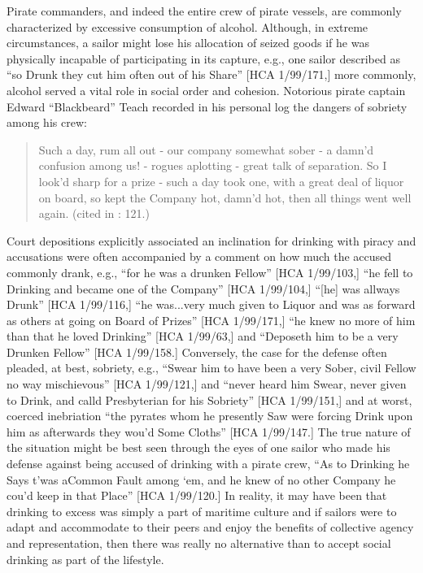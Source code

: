 Pirate commanders, and indeed the entire crew of pirate vessels, are commonly characterized by excessive consumption of alcohol. Although, in extreme circumstances, a sailor might lose his allocation of seized goods if he was physically incapable of participating in its capture, e.g., one sailor described as “so Drunk they cut him often out of his Share” [HCA 1/99/171,] more commonly, alcohol served a vital role in social order and cohesion. Notorious pirate captain Edward “Blackbeard” Teach recorded in his personal log the dangers of sobriety among his crew:

\begin{quotation}
Such a day, rum all out - our company somewhat sober - a damn’d confusion among us! - rogues aplotting - great talk of separation. So I look’d sharp for a prize - such a day took one, with a great deal of liquor on board, so kept the Company hot, damn’d hot, then all things went well again. (cited in \citealt{Bicheno2012}: 121.) \end{quotation}

Court depositions explicitly associated an inclination for drinking with piracy and accusations were often accompanied by a comment on how much the accused commonly drank, e.g., “for he was a drunken Fellow” [HCA 1/99/103,] “he fell to Drinking and became one of the Company” [HCA 1/99/104,] “[he] was allways Drunk” [HCA 1/99/116,] “he was...very much given to Liquor and was as forward as others at going on Board of Prizes” [HCA 1/99/171,] “he knew no more of him than that he loved Drinking” [HCA 1/99/63,] and “Deposeth him to be a very Drunken Fellow” [HCA 1/99/158.] Conversely, the case for the defense often pleaded, at best, sobriety, e.g., “Swear him to have been a very Sober, civil Fellow no way mischievous” [HCA 1/99/121,] and “never heard him Swear, never given to Drink, and calld Presbyterian for his Sobriety” [HCA 1/99/151,] and at worst, coerced inebriation “the pyrates whom he presently Saw were forcing Drink upon him as afterwards they wou’d Some Cloths” [HCA 1/99/147.] The true nature of the situation might be best seen through the eyes of one sailor who made his defense against being accused of drinking with a pirate crew, “As to Drinking he Says t’was aCommon Fault among ‘em, and he knew of no other Company he cou’d keep in that Place” [HCA 1/99/120.] In reality, it may have been that drinking to excess was simply a part of maritime culture and if sailors were to adapt and accommodate to their peers and enjoy the benefits of collective agency and representation, then there was really no alternative than to accept social drinking as part of the lifestyle.  

